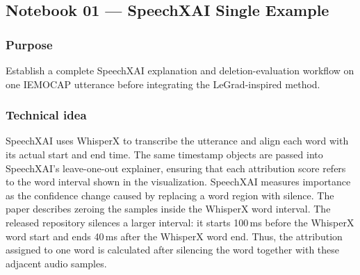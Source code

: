 \documentclass[11pt]{article}
\begin{document}
\subsection{Notebook 01 --- SpeechXAI Single Example}

\subsubsection*{Purpose}
Establish a complete SpeechXAI explanation and deletion-evaluation workflow on one IEMOCAP utterance before integrating the LeGrad-inspired method.

\subsubsection*{Technical idea}
SpeechXAI uses WhisperX to transcribe the utterance and align each word with its actual start and end time. The same timestamp objects are passed into SpeechXAI's leave-one-out explainer, ensuring that each attribution score refers to the word interval shown in the visualization. SpeechXAI measures importance as the confidence change caused by replacing a word region with silence. The paper describes zeroing the samples inside the WhisperX word interval. The released repository silences a larger interval: it starts 100\,ms before the WhisperX word start and ends 40\,ms after the WhisperX word end. Thus, the attribution assigned to one word is calculated after silencing the word together with these adjacent audio samples.
\end{document}
